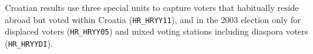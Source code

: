 Croatian results use three special units to capture voters that habitually
reside abroad but voted within Croatia (\texttt{HR\_HRYY11}), and in the
2003 election only for displaced voters (\texttt{HR\_HRYY05}) and mixed
voting stations including diaspora voters (\texttt{HR\_HRYYDI}).
